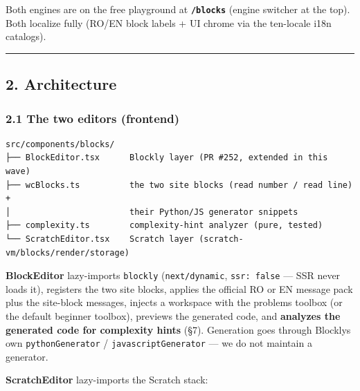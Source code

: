 \documentclass[
]{article}
\begin{document}
Both engines are on the free playground at \textbf{\texttt{/blocks}}
(engine switcher at the top). Both localize fully (RO/EN block labels +
UI chrome via the ten-locale i18n catalogs).

\begin{center}\rule{0.5\linewidth}{0.5pt}\end{center}

\subsection{2. Architecture}\label{2-architecture}

\subsubsection{2.1 The two editors
(frontend)}\label{21-the-two-editors-frontend}

\begin{verbatim}
src/components/blocks/
├── BlockEditor.tsx      Blockly layer (PR #252, extended in this wave)
├── wcBlocks.ts          the two site blocks (read number / read line) +
│                        their Python/JS generator snippets
├── complexity.ts        complexity-hint analyzer (pure, tested)
└── ScratchEditor.tsx    Scratch layer (scratch-vm/blocks/render/storage)
\end{verbatim}

\textbf{BlockEditor} lazy-imports \texttt{blockly}
(\texttt{next/dynamic}, \texttt{ssr:\ false} --- SSR never loads it),
registers the two site blocks, applies the official RO or EN message
pack plus the site-block messages, injects a workspace with the
problem\textquotesingle s toolbox (or the default beginner toolbox),
previews the generated code, and \textbf{analyzes the generated code for
complexity hints} (§7). Generation goes through
Blockly\textquotesingle s own \texttt{pythonGenerator} /
\texttt{javascriptGenerator} --- we do not maintain a generator.

\textbf{ScratchEditor} lazy-imports the Scratch stack:
\end{document}
